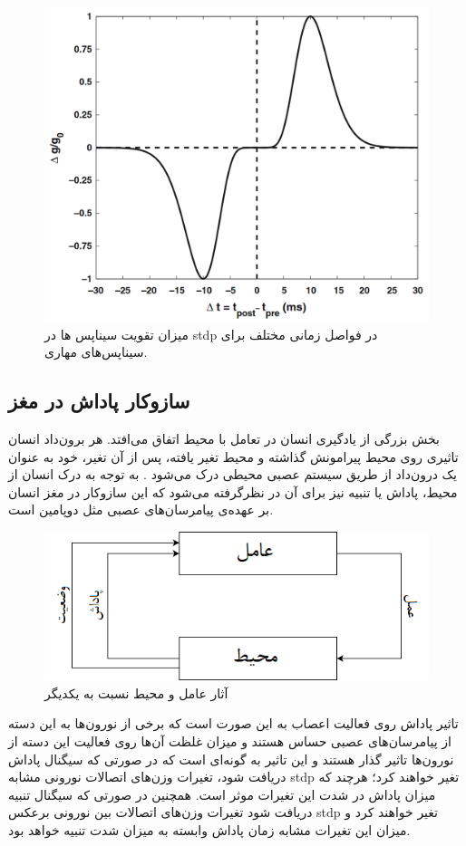 \documentclass[12pt]{report}
\begin{document}
	\begin{figure}[H]
		\centering
		\includegraphics[width=0.7\linewidth]{stdp-inh.png}
		\caption[NS]{
			میزان تقویت سیناپس ها در \gls{stdp} در فواصل زمانی مختلف برای سیناپس‌های مهاری.
		}
		\label{fig:stdp-inh}
	\end{figure}
	
	\subsection{سازوکار پاداش در مغز}
	
	بخش بزرگی از یادگیری انسان در تعامل با محیط اتفاق می‌افتد. هر برون‌داد انسان تاثیری روی محیط پیرامونش گذاشته و محیط تغیر یافته، پس از آن تغیر، خود به عنوان یک درون‌داد از طریق سیستم عصبی محیطی درک می‌شود
	\cite{sutton1998reinforcement}.
	به توجه به درک انسان از محیط، پاداش یا تنبیه نیز برای آن در نظرگرفته می‌شود که این ساز‌و‌کار در مغز انسان بر عهده‌ی پیامرسان‌های عصبی  مثل دوپامین است. 
	
	\begin{figure}[H]
		\centering
		\includegraphics[width=0.7\linewidth]{rl.png}
		\caption[NS]{
			آثار عامل و محیط نسبت به یکدیگر
		}
		\label{fig:rl}
	\end{figure}
	
	تاثیر پاداش روی فعالیت اعصاب به این صورت است که برخی از نورون‌ها به این دسته از پیامرسان‌‌های عصبی حساس هستند و میزان غلظت آن‌ها روی فعالیت این دسته از نورون‌ها تاثیر گذار هستند و این تاثیر به گونه‌ای است که در صورتی که سیگنال پاداش دریافت شود، تغیرات وزن‌های اتصالات نورونی مشابه \gls{stdp} تغیر خواهند کرد؛ هرچند که میزان پاداش در شدت این تغیرات موثر است. همچنین در صورتی که سیگنال تنبیه دریافت شود تغیرات وزن‌های اتصالات بین نورونی برعکس \gls{stdp} تغیر خواهند کرد و میزان این تغیرات مشابه زمان پاداش وابسته به میزان شدت تنبیه خواهد بود.
	
\end{document}
